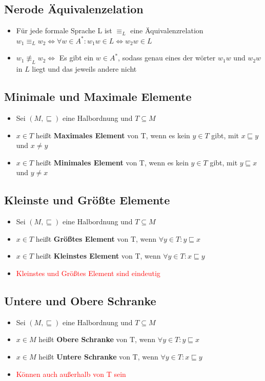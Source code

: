 \documentclass[a4paper,portrait]{scrartcl}
\begin{document}
\subsection{Nerode Äquivalenzelation}
\begin{itemize}
\item Für jede formale Sprache L ist $\equiv_{L}$ eine Äquivalenzrelation \\
$ w_{1} \equiv_{L} w_{2} \Leftrightarrow \forall w \in A^{*}: w_{1}w \in L \Leftrightarrow w_{2}w \in L  $
\item $w_{1} \not\equiv_{L} w_{2} \Leftrightarrow$ Es gibt ein $ w \in A^{*} $, sodass genau eines der wörter $ w_{1}w $ und $ w_{2}w $ in $L$ liegt und das jeweils andere nicht
\end{itemize}
\subsection{Minimale und Maximale Elemente}
\begin{itemize}
\item Sei $ (M, \sqsubseteq) $ eine Halbordnung und $ T \subseteq M $
\item $ x \in T $ heißt \textbf{Maximales Element} von T, wenn es kein $ y \in T $ gibt, mit $ x \sqsubseteq y $ und $ x \neq y $
\item $ x \in T $ heißt \textbf{Minimales Element} von T, wenn es kein $ y \in T $ gibt, mit $ y \sqsubseteq x $ und $ y \neq x $
\end{itemize}
\subsection{Kleinste und Größte Elemente}
\begin{itemize}
\item Sei $ (M, \sqsubseteq) $ eine Halbordnung und $ T \subseteq M $
\item $ x \in T $ heißt \textbf{Größtes Element} von T, wenn $ \forall y \in T: y \sqsubseteq x $
\item $ x \in T $ heißt \textbf{Kleinstes Element} von T, wenn $ \forall y \in T: x \sqsubseteq y $
\item \textcolor{red}{Kleinstes und Größtes Element sind eindeutig}
\end{itemize}
\subsection{Untere und Obere Schranke}
\begin{itemize}
\item Sei $ (M, \sqsubseteq) $ eine Halbordnung und $ T \subseteq M $
\item $ x \in M $ heißt \textbf{Obere Schranke} von T, wenn $ \forall y \in T: y \sqsubseteq x $
\item $ x \in M $ heißt \textbf{Untere Schranke} von T, wenn $ \forall y \in T: x \sqsubseteq y $
\item \textcolor{red}{Können auch außerhalb von T sein}
\end{itemize}
\end{document}
